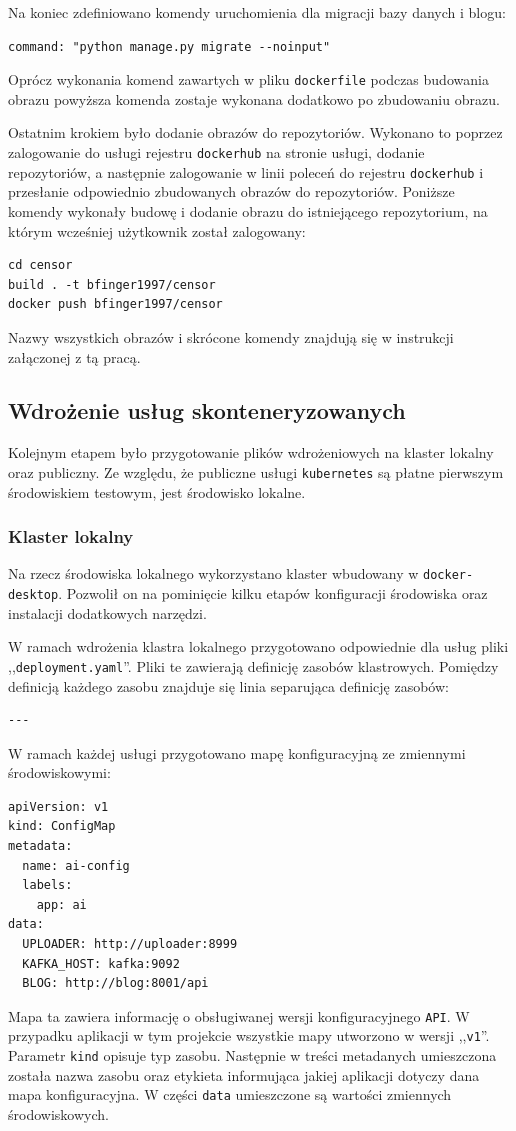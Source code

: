 \documentclass[12pt,twoside]{article}
\begin{document}
Na koniec zdefiniowano komendy uruchomienia dla migracji bazy danych i blogu:
\begin{lstlisting}
command: "python manage.py migrate --noinput"
\end{lstlisting}
Oprócz wykonania komend zawartych w pliku \texttt{dockerfile} podczas budowania obrazu powyższa komenda zostaje wykonana dodatkowo po zbudowaniu obrazu.

Ostatnim krokiem było dodanie obrazów do repozytoriów. Wykonano to poprzez zalogowanie do usługi rejestru \texttt{dockerhub} na stronie usługi\cite{hub}, dodanie repozytoriów, a następnie zalogowanie w linii poleceń do rejestru \texttt{dockerhub} i przesłanie odpowiednio zbudowanych obrazów do repozytoriów. Poniższe komendy wykonały budowę i dodanie obrazu do istniejącego repozytorium, na którym wcześniej użytkownik został zalogowany:
\begin{lstlisting}
cd censor
build . -t bfinger1997/censor
docker push bfinger1997/censor
\end{lstlisting}
Nazwy wszystkich obrazów i skrócone komendy znajdują się w instrukcji załączonej z tą pracą.

\subsection{Wdrożenie usług skonteneryzowanych}
Kolejnym etapem było przygotowanie plików wdrożeniowych na klaster lokalny oraz publiczny. Ze względu, że publiczne usługi \texttt{kubernetes} są płatne pierwszym środowiskiem testowym, jest środowisko lokalne.

\subsubsection{Klaster lokalny}
Na rzecz środowiska lokalnego wykorzystano klaster wbudowany w \texttt{docker-desktop}. Pozwolił on na pominięcie kilku etapów konfiguracji środowiska oraz instalacji dodatkowych narzędzi.

W ramach wdrożenia klastra lokalnego przygotowano odpowiednie dla usług pliki ,,\texttt{deployment.yaml}''. Pliki te zawierają definicję zasobów klastrowych.
Pomiędzy definicją każdego zasobu znajduje się linia separująca definicję zasobów:
\begin{lstlisting}
---
\end{lstlisting}

W ramach każdej usługi przygotowano mapę konfiguracyjną ze zmiennymi środowiskowymi:
\begin{lstlisting}
apiVersion: v1
kind: ConfigMap
metadata:
  name: ai-config
  labels:
    app: ai
data:
  UPLOADER: http://uploader:8999
  KAFKA_HOST: kafka:9092
  BLOG: http://blog:8001/api
\end{lstlisting}
Mapa ta zawiera informację o obsługiwanej wersji konfiguracyjnego \texttt{API}. W przypadku aplikacji w tym projekcie wszystkie mapy utworzono w wersji ,,\texttt{v1}''.
Parametr \texttt{kind} opisuje typ zasobu. Następnie w treści metadanych umieszczona została nazwa zasobu oraz etykieta informująca jakiej aplikacji dotyczy dana mapa konfiguracyjna.
W części \texttt{data} umieszczone są wartości zmiennych środowiskowych.
\end{document}
